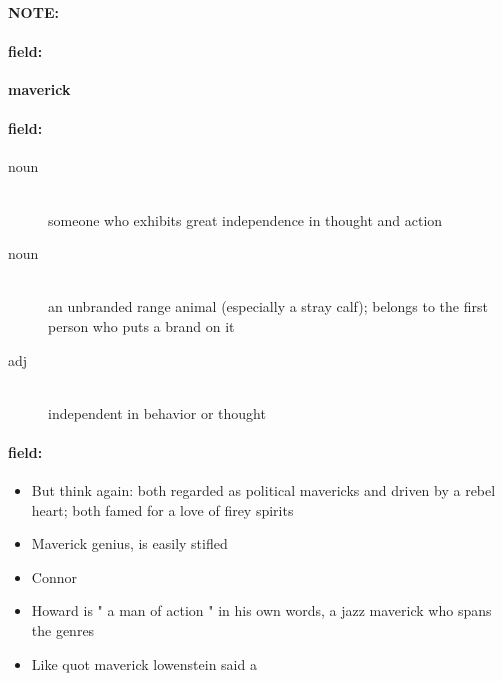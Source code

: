 \documentclass[12pt]{article}
\newenvironment{note}{\paragraph{NOTE:}}{}
\newenvironment{field}{\paragraph{field:}}{}
\begin{document}
\begin{note}
\begin{field}
\textbf{\large maverick}
\end{field}


\begin{field}
\begin{description}
\item[noun] \hfill \\ 
someone who exhibits great independence in thought and action

\item[noun] \hfill \\ 
an unbranded range animal (especially a stray calf); belongs to the first person who puts a brand on it

\item[adj] \hfill \\ 
independent in behavior or thought

\end{description}
\end{field}

\begin{field}
\begin{itemize}
\item But think again: both regarded as political mavericks and driven by a rebel heart; both famed for a love of firey spirits
\item Maverick genius, is easily stifled
\item  Connor
\item Howard is " a man of action " in his own words, a jazz maverick who spans the genres
\item Like quot maverick lowenstein said a
\end{itemize}
\end{field}
\end{note}
\end{document}
